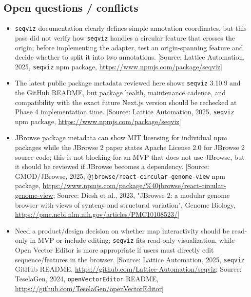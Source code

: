 \documentclass[11pt]{report}
\begin{document}
\subsection{Open questions / conflicts}
\begin{itemize}
\item \texttt{seqviz} documentation clearly defines simple annotation coordinates, but this pass did not verify how \texttt{seqviz} handles a circular feature that crosses the origin; before implementing the adapter, test an origin-spanning feature and decide whether to split it into two annotations. [Source: Lattice Automation, 2025, \texttt{seqviz} npm package, \url{https://www.npmjs.com/package/seqviz}]
\item The latest public package metadata reviewed here shows \texttt{seqviz} 3.10.9 and the GitHub README, but package health, maintenance cadence, and compatibility with the exact future Next.js version should be rechecked at Phase 4 implementation time. [Source: Lattice Automation, 2025, \texttt{seqviz} npm package, \url{https://www.npmjs.com/package/seqviz}]
\item JBrowse package metadata can show MIT licensing for individual npm packages while the JBrowse 2 paper states Apache License 2.0 for JBrowse 2 source code; this is not blocking for an MVP that does not use JBrowse, but it should be reviewed if JBrowse becomes a dependency. [Source: GMOD/JBrowse, 2025, \texttt{@jbrowse/react-circular-genome-view} npm package, \url{https://www.npmjs.com/package/\%40jbrowse/react-circular-genome-view}; Source: Diesh et al., 2023, "JBrowse 2: a modular genome browser with views of synteny and structural variation", Genome Biology, \url{https://pmc.ncbi.nlm.nih.gov/articles/PMC10108523/}]
\item Need a product/design decision on whether map interactivity should be read-only in MVP or include editing; \texttt{seqviz} fits read-only visualization, while Open Vector Editor is more appropriate if users must directly edit sequence/features in the browser. [Source: Lattice Automation, 2025, \texttt{seqviz} GitHub README, \url{https://github.com/Lattice-Automation/seqviz}; Source: TeselaGen, 2024, \texttt{openVectorEditor} README, \url{https://github.com/TeselaGen/openVectorEditor}]
\end{itemize}
\end{document}
